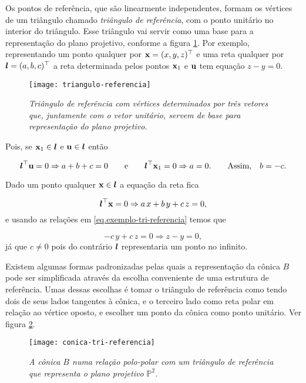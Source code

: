 Os pontos de referência, que são linearmente independentes, formam os vértices de um triângulo chamado \textit{triângulo de referência}, com o ponto unitário no interior do triângulo. Esse triângulo vai servir como uma base para a representação do plano projetivo, conforme a figura \ref{fig.triangulo-referencia}. Por exemplo, representando um ponto qualquer por $\mathbf{x}=(x,y,z)^\top$ e uma reta qualquer por $\boldsymbol{l}=(a,b,c)^\top$ a reta determinada pelos pontos $\mathbf{x}_1$ e ${\bf u}$ tem equação $z-y=0$.

\begin{figure}[!htb]
\centering
\texttt{[image: triangulo-referencia]}
\caption{{\it Triângulo de referência com vértices determinados por três vetores que, juntamente com o vetor unitário, servem de base para representação do plano projetivo.}}
\label{fig.triangulo-referencia}
\end{figure}

Pois, se $\mathbf{x}_1\in\boldsymbol{l}$ e ${\bf u}\in\boldsymbol{l}$ então

\begin{equation}\label{eq.exemplo-tri-referencia}
\boldsymbol{l}^\top{\bf u}=0\Rightarrow a+b+c=0\qquad\text{e}\qquad\boldsymbol{l}^\top\mathbf{x}_1=0\Rightarrow a=0.\qquad\text{Assim,}\quad b=-c.
\end{equation}

Dado um ponto qualquer $\mathbf{x}\in\boldsymbol{l}$ a equação da reta fica

\begin{equation*}
\boldsymbol{l}^\top\mathbf{x}=0\Rightarrow a\,x+b\,y+c\,z=0,
\end{equation*}
e usando as relações em \ref{eq.exemplo-tri-referencia} temos que

\begin{equation*}
-c\,y+c\,z=0\Rightarrow z-y=0,
\end{equation*}
já que $c\neq 0$ pois do contrário $\boldsymbol{l}$ representaria um ponto no infinito.

Existem algumas formas padronizadas pelas quais a representação da cônica $B$ pode ser simplificada através da escolha conveniente de uma estrutura de referência. Umas dessas escolhas é tomar o triângulo de referência como tendo dois de seus lados tangentes à cônica, e o terceiro lado como reta polar em relação ao vértice oposto, e escolher um ponto  da cônica como ponto unitário. Ver figura \ref{fig.conica-tri-referencia}.

\begin{figure}[!htb]
\centering
\texttt{[image: conica-tri-referencia]}
\caption{{\it A cônica $B$ numa relação polo-polar com um triângulo de referência que representa o plano projetivo $\mathbb{P}^2$}.}
\label{fig.conica-tri-referencia}
\end{figure}

